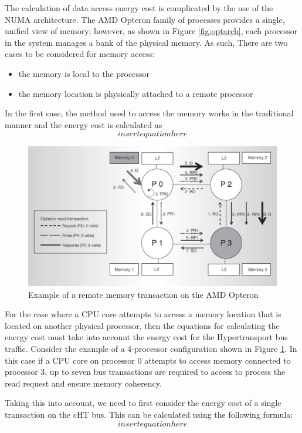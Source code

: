 \documentclass[times, 10pt,onecolumn]{article}
\begin{document}
The calculation of data access energy cost is complicated by the use of
the NUMA architecture.  The AMD Opteron family of processes provides a
single, unified view of memory; however, as shown in Figure
\ref{fig:optarch}, each processor in the system manages a bank of the
physical memory.  As such, There are two cases to be considered for
memory access:
\begin{itemize}
\item the memory is local to the processor
\item the memory location is physically attached to a remote processor
\end{itemize}
In the first case, the method used to access the memory works in the
traditional manner and the energy cost is calculated as
\begin{equation}
  \label{eq:Level1cost}
  insert equation here
\end{equation}
\begin{figure}
  \centering
  \includegraphics[scale=0.50]{amdoptcht.pdf}
  \caption{Example of a remote memory transaction on the AMD Opteron \cite{amd2004}}
  \label{fig:amdcht}
\end{figure}
For the case where a CPU core attempts to access a memory location that
is located on another physical processor, then the equations for
calculating the energy cost must take into account the energy cost for
the Hypertransport bus traffic.   Consider the example of a 4-processor
configuration shown in Figure \ref{fig:amdcht}.  In this case if a CPU
core on processor 0 attempts to access memory connected to processor 3,
up to seven bus transactions are required to access to process the read
request and ensure memory coherency.

Taking this into account, we need to first consider the energy cost of a
single transaction on the cHT bus.  This can be calculated using the
following formula:
\begin{equation}
\label{eq:singelHTcost}
insert equation here
\end{equation}
\end{document}
